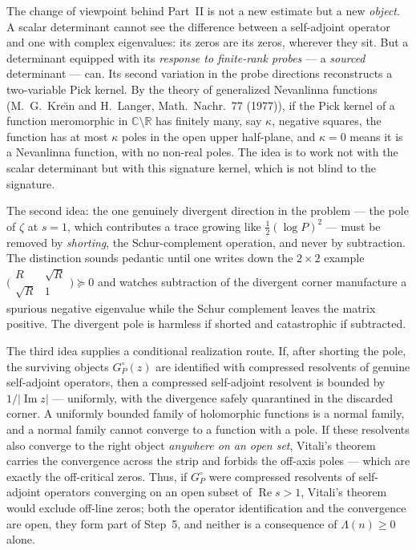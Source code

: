 \documentclass[11pt]{amsart}
\theoremstyle{definition}
\theoremstyle{remark}
\theoremstyle{definition}
\renewcommand{\Re}{\operatorname{Re}}
\renewcommand{\Im}{\operatorname{Im}}
\newcommand{\R}{\mathbb{R}}
\newcommand{\C}{\mathbb{C}}
\begin{document}
The change of viewpoint behind Part~II is not a new estimate but a new \emph{object}. A scalar
determinant cannot see the difference between a self-adjoint operator and one with complex eigenvalues:
its zeros are its zeros, wherever they sit. But a determinant equipped with its \emph{response to
finite-rank probes} --- a \emph{sourced} determinant --- can. Its second variation in the probe directions
reconstructs a two-variable Pick kernel. By the theory of generalized Nevanlinna functions
(M.~G.~Kre\u{\i}n and H.~Langer, Math.\ Nachr.\ 77 (1977)), if the Pick kernel of a function meromorphic in
$\C\setminus\R$ has finitely many, say $\kappa$, negative squares, the function has at most $\kappa$ poles
in the open upper half-plane, and $\kappa=0$ means it is a Nevanlinna function, with no non-real poles.
The idea is to work not with the scalar determinant but with this signature kernel, which is not blind
to the signature.

The second idea: the one genuinely divergent direction in the
problem --- the pole of $\zeta$ at $s=1$, which contributes a trace growing like $\tfrac12(\log P)^2$ ---
must be removed by \emph{shorting}, the Schur-complement operation, and never by subtraction. The
distinction sounds pedantic until one writes down the $2\times2$ example
$\bigl(\begin{smallmatrix}R&\sqrt R\\\sqrt R&1\end{smallmatrix}\bigr)\succeq0$ and watches subtraction of
the divergent corner manufacture a spurious negative eigenvalue while the Schur complement leaves the
matrix positive. The divergent pole is harmless if shorted and catastrophic if subtracted.

The third idea supplies a conditional realization route.  If, after shorting the pole, the surviving
objects $G_P^\circ(z)$ are identified with compressed resolvents of genuine self-adjoint operators, then
a compressed self-adjoint resolvent is bounded by $1/|\Im z|$ ---
uniformly, with the divergence safely quarantined in the discarded corner. A uniformly bounded family of
holomorphic functions is a normal family, and a normal family cannot converge to a function with a pole.
If these resolvents also converge to the right object \emph{anywhere on an open set}, Vitali's theorem
carries the convergence across the strip and forbids the off-axis poles --- which are exactly the
off-critical zeros. Thus, if $G_P^\circ$ were compressed resolvents of self-adjoint operators converging
on an open subset of $\Re s>1$, Vitali's theorem would exclude off-line zeros; both the operator
identification and the convergence are open, they form part of Step~5, and neither is a consequence of
$\Lambda(n)\ge0$ alone.
\end{document}
